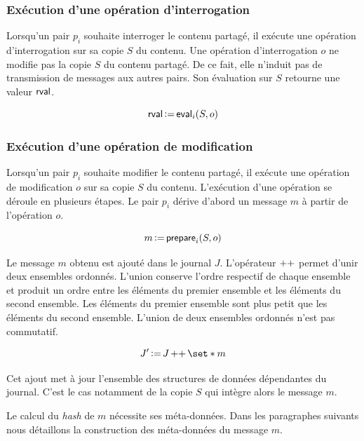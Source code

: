 \subsubsection{Exécution d'une opération d'interrogation}

Lorsqu'un pair $p_i$ souhaite interroger le contenu partagé, il exécute une opération d'interrogation sur sa copie $S$ du contenu.
Une opération d'interrogation $o$ ne modifie pas la copie $S$ du contenu partagé.
De ce fait, elle n'induit pas de transmission de messages aux autres pairs.
Son évaluation sur $S$ retourne une valeur $\operatorname{\mathsf{rval}}$.

\begin{equation*}
    \operatorname{\mathsf{rval}} \operatorname{\vcentcolon=} \operatorname{\mathsf{eval}}_i(S, o)
\end{equation*}


\subsubsection{Exécution d'une opération de modification}

Lorsqu'un pair $p_i$ souhaite modifier le contenu partagé, il exécute une opération de modification $o$ sur sa copie $S$ du contenu.
L'exécution d'une opération se déroule en plusieurs étapes.
Le pair $p_i$ dérive d'abord un message $m$ à partir de l'opération $o$.

\begin{equation*}
    m \operatorname{\vcentcolon=} \operatorname{\mathsf{prepare}}_i(S, o)
\end{equation*}

Le message $m$ obtenu est ajouté dans le journal $J$.
L'opérateur $\operatorname{\mathsf{\operatorname{++}}}$ permet d'unir deux ensembles ordonnés.
L'union conserve l'ordre respectif de chaque ensemble et produit un ordre entre les éléments du premier ensemble et les éléments du second ensemble.
Les éléments du premier ensemble sont plus petit que les éléments du second ensemble.
L'union de deux ensembles ordonnés n'est pas commutatif.

\begin{equation*}
    J' \assign J \lappend \set*{m}
\end{equation*}

Cet ajout met à jour l'ensemble des structures de données dépendantes du journal.
C'est le cas notamment de la copie $S$ qui intègre alors le message $m$.

Le calcul du \emph{hash} de $m$ nécessite ses méta-données.
Dans les paragraphes suivants nous détaillons la construction des méta-données du message $m$.

